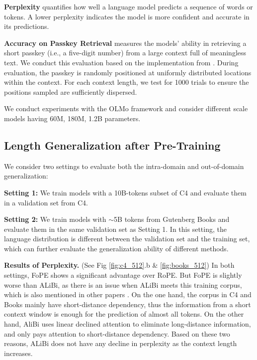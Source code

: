\textbf{Perplexity} quantifies how well a language model predicts a sequence of words or tokens. A lower perplexity indicates the model is more confident and accurate in its predictions.

\textbf{Accuracy on Passkey Retrieval} \citep{mohtashami2023landmark} measures the models' ability in retrieving a short passkey (i.e., a five-digit number) from a large context full of meaningless text. 
We conduct this evaluation based on the implementation from \citep{peng2023yarn}. During evaluation, the passkey is randomly positioned at uniformly distributed locations within the context. For each context length, we test for 1000 trials to ensure the positions sampled are sufficiently dispersed.

We conduct experiments with the OLMo \citep{groeneveld2024olmo} framework and consider different scale models having 60M, 180M, 1.2B parameters. 

\subsection{Length Generalization after Pre-Training}
\label{subsec:pre-training}
We consider two settings to evaluate both the intra-domain and out-of-domain generalization: 

\textbf{Setting 1:} We train models with a 10B-tokens subset of C4 \citep{raffel2020exploring} and evaluate them in a validation set from C4. 

\textbf{Setting 2:} We train models with $\sim$5B tokens from Gutenberg Books \citep{gutenbergbooks} and evaluate them in the same validation set as Setting 1. In this setting, the language distribution is different between the validation set and the training set, which can further evaluate the generalization ability of different methods.

\textbf{Results of Perplexity.} (See Fig \ref{fig:c4_512}.b \& \ref{fig:books_512}) In both settings, FoPE shows a significant advantage over RoPE. But FoPE is slightly worse than ALiBi, as there is an issue when ALiBi meets this training corpus, which is also mentioned in other papers \citep{peng2023yarn, chen2024clex}. On the one hand, the corpus in C4 and Books mainly have short-distance dependency, thus the information from a short context window is enough for the prediction of almost all tokens. On the other hand, AliBi uses linear declined attention to eliminate long-distance information, and only pays attention to short-distance dependency. Based on these two reasons, ALiBi does not have any decline in perplexity as the context length increases. 

